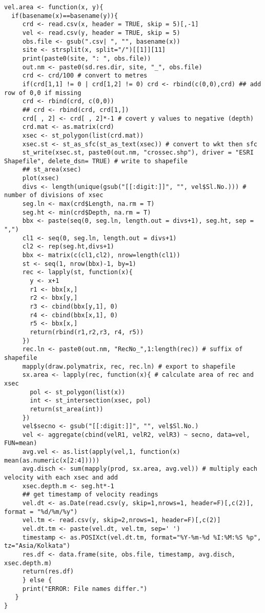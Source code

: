 \documentclass[a4paper]{article}
\begin{document}
\begin{verbatim}
vel.area <- function(x, y){
  if(basename(x)==basename(y)){
     crd <- read.csv(x, header = TRUE, skip = 5)[,-1]
     vel <- read.csv(y, header = TRUE, skip = 5)
     obs.file <- gsub(".csv| ", "", basename(x))
     site <- strsplit(x, split="/")[[1]][11]
     print(paste0(site, ": ", obs.file))
     out.nm <- paste0(sd.res.dir, site, "_", obs.file)
     crd <- crd/100 # convert to metres
     if(crd[1,1] != 0 | crd[1,2] != 0) crd <- rbind(c(0,0),crd) ## add row of 0,0 if missing
     crd <- rbind(crd, c(0,0))
     ## crd <- rbind(crd, crd[1,])
     crd[ , 2] <- crd[ , 2]*-1 # covert y values to negative (depth)
     crd.mat <- as.matrix(crd)
     xsec <- st_polygon(list(crd.mat))
     xsec.st <- st_as_sfc(st_as_text(xsec)) # convert to wkt then sfc
     st_write(xsec.st, paste0(out.nm, "crossec.shp"), driver = "ESRI Shapefile", delete_dsn= TRUE) # write to shapefile        
     ## st_area(xsec)
     plot(xsec)
     divs <- length(unique(gsub("[[:digit:]]", "", vel$Sl.No.))) # number of divisions of xsec
     seg.ln <- max(crd$Length, na.rm = T)
     seg.ht <- min(crd$Depth, na.rm = T)
     bbx <- paste(seq(0, seg.ln, length.out = divs+1), seg.ht, sep = ",")
     cl1 <- seq(0, seg.ln, length.out = divs+1)
     cl2 <- rep(seg.ht,divs+1)
     bbx <- matrix(c(cl1,cl2), nrow=length(cl1))
     st <- seq(1, nrow(bbx)-1, by=1)
     rec <- lapply(st, function(x){
       y <- x+1
       r1 <- bbx[x,]
       r2 <- bbx[y,]
       r3 <- cbind(bbx[y,1], 0)
       r4 <- cbind(bbx[x,1], 0)
       r5 <- bbx[x,]
       return(rbind(r1,r2,r3, r4, r5))
     })
     rec.ln <- paste0(out.nm, "RecNo_",1:length(rec)) # suffix of shapefile
     mapply(draw.polymatrix, rec, rec.ln) # export to shapefile        
     sx.area <- lapply(rec, function(x){ # calculate area of rec and xsec
       pol <- st_polygon(list(x))
       int <- st_intersection(xsec, pol)
       return(st_area(int))
     })
     vel$secno <- gsub("[[:digit:]]", "", vel$Sl.No.)
     vel <- aggregate(cbind(velR1, velR2, velR3) ~ secno, data=vel, FUN=mean)
     avg.vel <- as.list(apply(vel,1, function(x) mean(as.numeric(x[2:4]))))
     avg.disch <- sum(mapply(prod, sx.area, avg.vel)) # multiply each velocity with each xsec and add
     xsec.depth.m <- seg.ht*-1
     ## get timestamp of velocity readings
     vel.dt <- as.Date(read.csv(y, skip=1,nrows=1, header=F)[,c(2)], format = "%d/%m/%y")
     vel.tm <- read.csv(y, skip=2,nrows=1, header=F)[,c(2)]
     vel.dt.tm <- paste(vel.dt, vel.tm, sep=' ')
     timestamp <- as.POSIXct(vel.dt.tm, format="%Y-%m-%d %I:%M:%S %p", tz="Asia/Kolkata") 
     res.df <- data.frame(site, obs.file, timestamp, avg.disch, xsec.depth.m)
     return(res.df)
     } else {
     print("ERROR: File names differ.")
   }
}
\end{verbatim}
\end{document}
